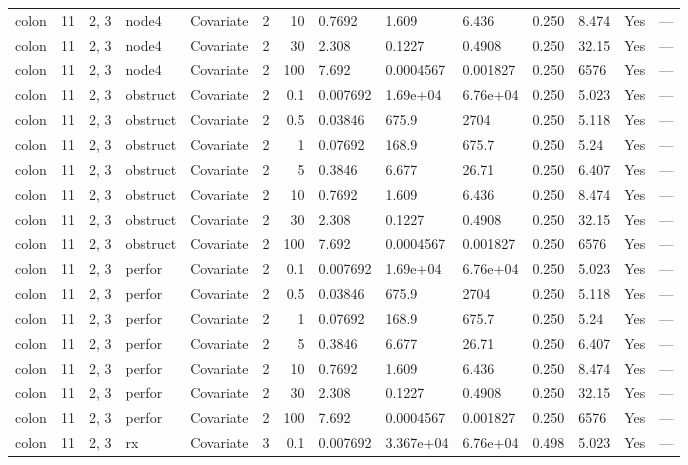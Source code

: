 \begin{tabular}{lrlllrrlllllll}
  colon & 11 & 2, 3 & node4 & Covariate & 2 &    10 & 0.7692 & 1.609 & 6.436 & 0.250 & 8.474 & Yes & --- \\ 
  colon & 11 & 2, 3 & node4 & Covariate & 2 &    30 & 2.308 & 0.1227 & 0.4908 & 0.250 & 32.15 & Yes & --- \\ 
  colon & 11 & 2, 3 & node4 & Covariate & 2 &   100 & 7.692 & 0.0004567 & 0.001827 & 0.250 & 6576 & Yes & --- \\ 
  colon & 11 & 2, 3 & obstruct & Covariate & 2 &   0.1 & 0.007692 & 1.69e+04 & 6.76e+04 & 0.250 & 5.023 & Yes & --- \\ 
  colon & 11 & 2, 3 & obstruct & Covariate & 2 &   0.5 & 0.03846 & 675.9 & 2704 & 0.250 & 5.118 & Yes & --- \\ 
  colon & 11 & 2, 3 & obstruct & Covariate & 2 &     1 & 0.07692 & 168.9 & 675.7 & 0.250 & 5.24 & Yes & --- \\ 
  colon & 11 & 2, 3 & obstruct & Covariate & 2 &     5 & 0.3846 & 6.677 & 26.71 & 0.250 & 6.407 & Yes & --- \\ 
  colon & 11 & 2, 3 & obstruct & Covariate & 2 &    10 & 0.7692 & 1.609 & 6.436 & 0.250 & 8.474 & Yes & --- \\ 
  colon & 11 & 2, 3 & obstruct & Covariate & 2 &    30 & 2.308 & 0.1227 & 0.4908 & 0.250 & 32.15 & Yes & --- \\ 
  colon & 11 & 2, 3 & obstruct & Covariate & 2 &   100 & 7.692 & 0.0004567 & 0.001827 & 0.250 & 6576 & Yes & --- \\ 
  colon & 11 & 2, 3 & perfor & Covariate & 2 &   0.1 & 0.007692 & 1.69e+04 & 6.76e+04 & 0.250 & 5.023 & Yes & --- \\ 
  colon & 11 & 2, 3 & perfor & Covariate & 2 &   0.5 & 0.03846 & 675.9 & 2704 & 0.250 & 5.118 & Yes & --- \\ 
  colon & 11 & 2, 3 & perfor & Covariate & 2 &     1 & 0.07692 & 168.9 & 675.7 & 0.250 & 5.24 & Yes & --- \\ 
  colon & 11 & 2, 3 & perfor & Covariate & 2 &     5 & 0.3846 & 6.677 & 26.71 & 0.250 & 6.407 & Yes & --- \\ 
  colon & 11 & 2, 3 & perfor & Covariate & 2 &    10 & 0.7692 & 1.609 & 6.436 & 0.250 & 8.474 & Yes & --- \\ 
  colon & 11 & 2, 3 & perfor & Covariate & 2 &    30 & 2.308 & 0.1227 & 0.4908 & 0.250 & 32.15 & Yes & --- \\ 
  colon & 11 & 2, 3 & perfor & Covariate & 2 &   100 & 7.692 & 0.0004567 & 0.001827 & 0.250 & 6576 & Yes & --- \\ 
  colon & 11 & 2, 3 & rx & Covariate & 3 &   0.1 & 0.007692 & 3.367e+04 & 6.76e+04 & 0.498 & 5.023 & Yes & --- \\ 

\end{tabular}
